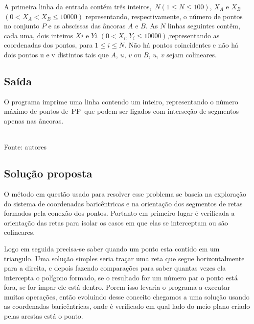 \documentclass[12pt,a4paper]{article}
\begin{document}
A primeira linha da entrada contém três inteiros, $N(1 \leqslant N \leqslant 100)$, $X_A$ e $X_B$ $(0 < X_A < X_B \leqslant 10000)$ representando, respectivamente, o número de pontos no conjunto $P$ e as abscissas das âncoras $A$ e $B$. As $N$ linhas seguintes contêm, cada uma, dois inteiros $Xi$ e $Yi$ $(0 < X_i, Y_i \leqslant 10000)$,representando as coordenadas dos pontos, para $1 \leqslant i \leqslant N$. Não há pontos coincidentes e não há dois pontos u e v distintos tais que $A$, $u$, $v$ ou $B$, $u$, $v$ sejam colineares.

\subsection{Saída}

O programa imprime uma linha contendo um inteiro, representando o número máximo de pontos de PP que podem ser ligados com interseção de segmentos apenas nas âncoras.

\begin{center}
	\footnotesize{\\Fonte: autores}
\end{center}

\subsection{Solução proposta}

O método em questão usado para resolver esse problema se baseia na exploração do sistema de coordenadas baricêntricas e na orientação dos segmentos de retas formados pela conexão dos pontos. Portanto em primeiro lugar é verificada a orientação das retas para isolar os casos em que elas se interceptam ou são colineares.

Logo em seguida precisa-se saber quando um ponto esta contido em um triangulo. Uma solução simples seria traçar uma reta que segue horizontalmente para a direita, e depois fazendo comparações para saber quantas vezes ela intercepta o polígono formado, se o resultado for um número par o ponto está fora, se for impar ele está dentro. Porem isso levaria o programa a executar muitas operações, então evoluindo desse conceito chegamos a uma solução usando as coordenadas baricêntricas, onde é verificado em qual lado do meio plano criado pelas arestas está o ponto.
\end{document}
